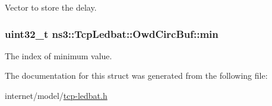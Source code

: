 Vector to store the delay. 

\subsubsection[{\texorpdfstring{min}{min}}]{\setlength{\rightskip}{0pt plus 5cm}uint32\+\_\+t ns3\+::\+Tcp\+Ledbat\+::\+Owd\+Circ\+Buf\+::min}\hypertarget{structns3_1_1TcpLedbat_1_1OwdCircBuf_a2ca25f4c2bd8afb4cf7ec19f3e74e14d}{}\label{structns3_1_1TcpLedbat_1_1OwdCircBuf_a2ca25f4c2bd8afb4cf7ec19f3e74e14d}


The index of minimum value. 



The documentation for this struct was generated from the following file\+:\begin{DoxyCompactItemize}
\item 
internet/model/\hyperlink{tcp-ledbat_8h}{tcp-\/ledbat.\+h}\end{DoxyCompactItemize}

